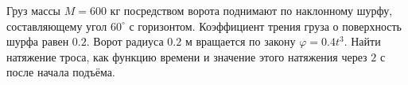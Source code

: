 Груз массы $M = 600$ кг посредством ворота поднимают по наклонному шурфу,
составляющему угол $60^{\circ}$ с горизонтом.
Коэффициент трения груза о поверхность шурфа равен $0.2$.
Ворот радиуса $0.2$ м вращается по закону $\varphi = 0.4t^3$.
Найти натяжение троса, как функцию времени
и значение этого натяжения через $2$ с после начала подъёма.

